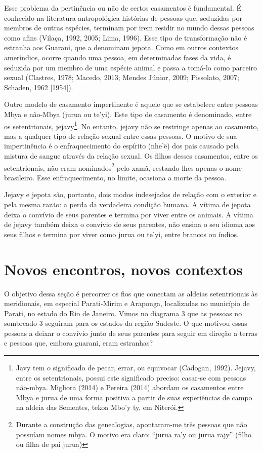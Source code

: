 {{Esse problema da pertinência ou não de certos casamentos é fundamental.
É conhecido na literatura antropológica histórias de pessoas que,
seduzidas por membros de outras espécies, terminam por irem residir no
mundo dessas pessoas como afins (Vilaça, 1992, 2005; Lima, 1996). Esse
tipo de transformação não é estranha aos Guarani, que a denominam
jepota. Como em outros contextos ameríndios, ocorre quando uma pessoa,
em determinadas fases da vida, é seduzida por um membro de uma espécie
animal e passa a tomá-lo como parceiro sexual (Clastres, 1978; Macedo,
2013; Mendes Júnior, 2009; Pissolato, 2007; Schaden, 1962 [1954]).

Outro modelo de casamento impertinente é aquele que se estabelece entre
pessoas Mbya e não-Mbya (jurua ou te’yi). Este tipo de casamento é
denominado, entre os setentrionais, jejavy\footnote{Javy tem o
significado de pecar, errar, ou equivocar (Cadogan, 1992). Jejavy,
entre os setentrionais, possui este significado preciso: casar-se com
pessoas não-mbya. Migliora (2014) e Pereira (2014) abordam os
casamentos entre Mbya e jurua de uma forma positiva a partir de suas
experiências de campo na aldeia das Sementes, tekoa Mbo’y ty, em
Niterói.}. No entanto, jejavy não se restringe apenas ao casamento, mas
a qualquer tipo de relação sexual entre essas pessoas. O motivo de sua
impertinência é o enfraquecimento do espírito (nhe’ë) dos pais causado
pela mistura de sangue através da relação sexual. Os filhos desses
casamentos, entre os setentrionais, não eram nominados\footnote{Durante
a construção das genealogias, apontaram-me três pessoas que não
possuíam nomes mbya. O motivo era claro: ``jurua ra’y ou jurua rajy''
(filho ou filha de pai jurua)} pelo xamã, restando-lhes apenas o nome
brasileiro. Esse enfraquecimento, no limite, ocasiona a morte da
pessoa.

Jejavy e jepota são, portanto, dois modos indesejados de relação com o
exterior e pela mesma razão: a perda da verdadeira condição humana.
A vítima de jepota deixa o convívio de seus parentes e termina por
viver entre os animais. A vítima de jejavy também deixa o convívio de
seus parentes, não ensina o seu idioma aos seus filhos e termina por
viver como jurua ou te’yi, entre brancos ou índios. 

\section{Novos encontros, novos contextos}

O objetivo dessa seção é percorrer os fios que conectam as aldeias
setentrionais às meridionais, em especial Parati-Mirim e Araponga,
localizadas no município de Parati, no estado do Rio de Janeiro. Vimos
no diagrama 3 que as pessoas no sombreado 3 seguiram para os estados da
região Sudeste. O que motivou essas pessoas a deixar o convívio junto
de seus parentes para seguir em direção a terras e pessoas que, embora
guarani, eram estranhas?

}}
